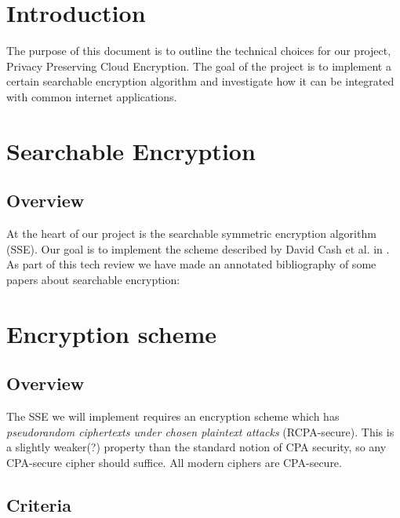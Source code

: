 \documentclass[onecolumn, draftclsnofoot,10pt, compsoc]{IEEEtran}
\begin{document}
\section{ Introduction }

The purpose of this document is to outline the technical choices for our project, Privacy Preserving Cloud Encryption. The goal of the project is to implement a certain searchable encryption algorithm and investigate how it can be integrated with common internet applications.


\section{ Searchable Encryption }

\subsection{ Overview }

At the heart of our project is the searchable symmetric encryption algorithm (SSE).
Our goal is to implement the scheme described by David Cash et al. in \cite{cash14}. As part of this tech review we have made an annotated bibliography of some papers about searchable encryption:
\cite{yavuz15}
\cite{cash14}
\cite{song00}


\section{ Encryption scheme }

\subsection{ Overview }

The SSE we will implement requires an encryption scheme which has \textit{pseudorandom ciphertexts under chosen plaintext attacks} (RCPA-secure).
This is a slightly weaker(?) property than the standard notion of CPA security,
so any CPA-secure cipher should suffice. All modern ciphers are CPA-secure.


\subsection{ Criteria }
\end{document}
